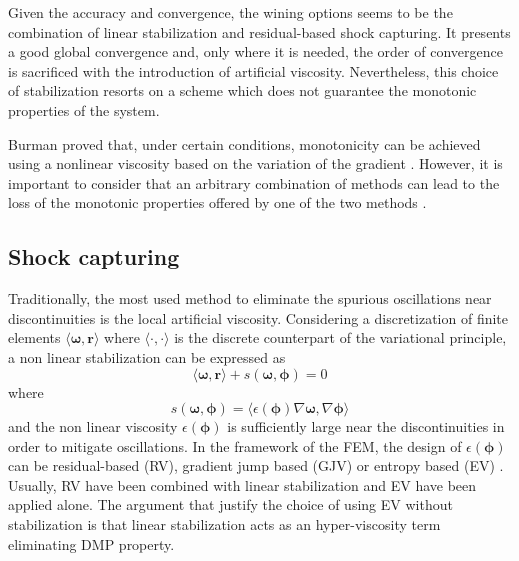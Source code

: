 Given the accuracy and convergence, the wining options seems to be the combination of linear stabilization and residual-based shock capturing. It presents a good global convergence and, only where it is needed, the order of convergence is sacrificed with the introduction of artificial viscosity. Nevertheless, this choice of stabilization resorts on a scheme which does not guarantee the monotonic properties of the system.

Burman proved that, under certain conditions, monotonicity can be achieved using a nonlinear viscosity based on the variation of the gradient \cite{burman2007}. However, it is important to consider that an arbitrary combination of methods can lead to the loss of the monotonic properties offered by one of the two methods \cite{badia2014}.




\subsection{Shock capturing}


Traditionally, the most used method to eliminate the spurious oscillations near discontinuities is the local artificial viscosity. Considering a discretization of finite elements $\langle\bm{\omega}, \mathbf{r}\rangle$ where $\langle \cdot,\cdot \rangle$ is the discrete counterpart of the variational principle, a non linear stabilization can be expressed as
\begin{equation}
    \langle\bm{\omega}, \mathbf{r}\rangle + s(\bm{\omega}, \bm{\phi}) = 0
\end{equation}
where
\begin{equation}
    s(\bm{\omega}, \bm{\phi}) = \langle \epsilon(\bm\phi) \nabla\bm\omega , \nabla\bm\phi \rangle
\end{equation}
and the non linear viscosity $\epsilon(\bm\phi)$ is sufficiently large near the discontinuities in order to mitigate oscillations.
In the framework of the FEM, the design of $\epsilon(\bm\phi)$ can be residual-based (RV), gradient jump based (GJV) or entropy based (EV) \cite{guermond2011}.
Usually, RV have been combined with linear stabilization and EV have been applied alone. The argument that justify the choice of using EV without stabilization is that linear stabilization acts as an hyper-viscosity term eliminating DMP property.

